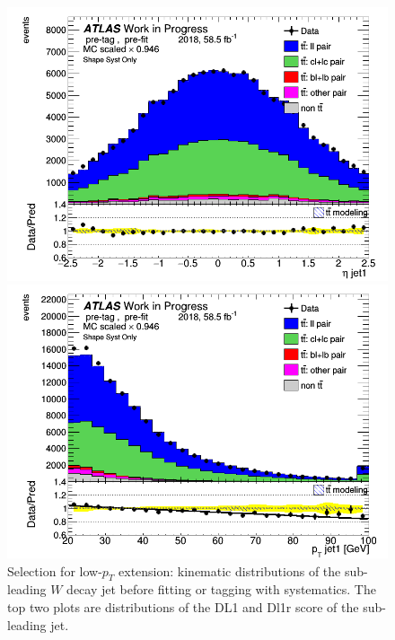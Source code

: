 \documentclass[letterpaper,12pt]{article}
\begin{document}
\begin{figure}[H]
\begin{minipage}[b]{.45\textwidth}
\centering
\includegraphics[width=1\textwidth]{Distribution_March/DataMC_J1_eta.png}
\end{minipage}\hfill
\begin{minipage}[b]{.45\textwidth}
\centering
\includegraphics[width=1\textwidth]{Distribution_March/DataMC_J1_pt.png}
\end{minipage}
\caption{Selection for low-$p_T$ extension: kinematic distributions of the 
sub-leading $W$ decay jet before fitting or tagging with systematics. 
The top two plots are distributions of the DL1 and Dl1r score of the 
sub-leading jet.} \label{fig:lowpT_selection}
\end{figure}
\end{document}
